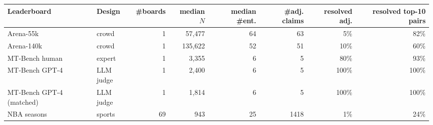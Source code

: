 \begin{tabular}{llrrrrrr}
\toprule
 Leaderboard & Design & \#boards & median $N$ & median \#ent. & \#adj. claims & resolved adj. & resolved top-10 pairs \\
\midrule
Arena-55k & crowd & 1 & 57{,}477 & 64 & 63 & 5\% & 82\% \\
Arena-140k & crowd & 1 & 135{,}622 & 52 & 51 & 10\% & 60\% \\
MT-Bench human & expert & 1 & 3{,}355 & 6 & 5 & 80\% & 93\% \\
MT-Bench GPT-4 & LLM judge & 1 & 2{,}400 & 6 & 5 & 100\% & 100\% \\
MT-Bench GPT-4 (matched) & LLM judge & 1 & 1{,}814 & 6 & 5 & 100\% & 100\% \\
NBA seasons & sports & 69 & 943 & 25 & 1418 & 1\% & 24\% \\
\bottomrule
\end{tabular}
